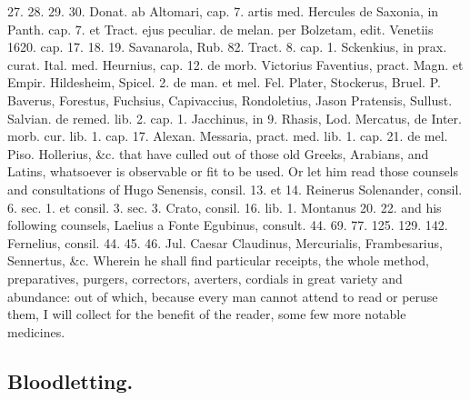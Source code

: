 27. 28. 29. 30. Donat. ab Altomari, cap. 7. artis med. Hercules de
Saxonia, in Panth. cap. 7. et Tract. ejus peculiar. de melan. per
Bolzetam, edit. Venetiis 1620. cap. 17. 18. 19. Savanarola, Rub. 82.
Tract. 8. cap. 1. Sckenkius, in prax. curat. Ital. med. Heurnius, cap.
12. de morb. Victorius Faventius, pract. Magn. et Empir. Hildesheim,
Spicel. 2. de man. et mel. Fel. Plater, Stockerus, Bruel. P. Baverus,
Forestus, Fuchsius, Capivaccius, Rondoletius, Jason Pratensis, Sullust.
Salvian. de remed. lib. 2. cap. 1. Jacchinus, in 9. Rhasis, Lod.
Mercatus, de Inter. morb. cur. lib. 1. cap. 17. Alexan. Messaria,
pract. med. lib. 1. cap. 21. de mel. Piso. Hollerius, \&c. that have
culled out of those old Greeks, Arabians, and Latins, whatsoever is
observable or fit to be used. Or let him read those counsels and
consultations of Hugo Senensis, consil. 13. et 14. Reinerus Solenander,
consil. 6. sec. 1. et consil. 3. sec. 3. Crato, consil. 16. lib. 1.
Montanus 20. 22. and his following counsels, Laelius a Fonte Egubinus,
consult. 44. 69. 77. 125. 129. 142. Fernelius, consil. 44. 45. 46. Jul.
Caesar Claudinus, Mercurialis, Frambesarius, Sennertus, \&c. Wherein he
shall find particular receipts, the whole method, preparatives,
purgers, correctors, averters, cordials in great variety and abundance:
out of which, because every man cannot attend to read or peruse them, I
will collect for the benefit of the reader, some few more notable
medicines.

\subsection{Bloodletting.}

